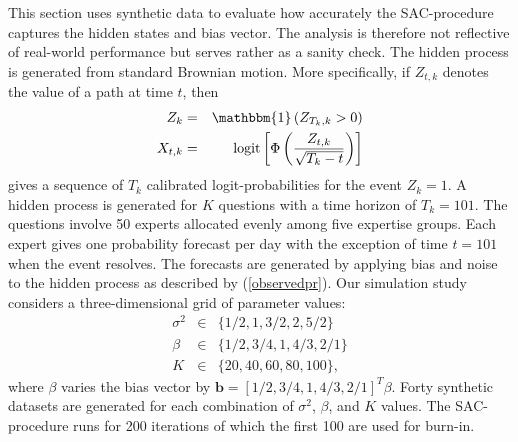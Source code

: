 \documentclass[aoas, preprint]{imsart}
\numberwithin{equation}{section}
\theoremstyle{plain}
\newcommand{\logit}{\text{logit}}
\begin{document}
This section uses synthetic data to evaluate how accurately the SAC-procedure captures the hidden states and bias vector. The analysis is therefore not reflective of real-world performance but serves rather as a sanity check. 
The hidden process is generated from standard Brownian motion.  More specifically, if $Z_{t,k}$ denotes the value of a path at time $t$, then
\begin{eqnarray*}
Z_k &=& \mathbbm{1}\left( Z_{T_k, k}  > 0\right)\\
 X_{t,k} &=& \logit \left[ \Phi \left(\frac{Z_{t, k}}{\sqrt{T_k- t}} \right) \right]
\end{eqnarray*}
gives a sequence of $T_k$ calibrated logit-probabilities for the event $Z_k = 1$. A hidden process is generated for $K$ questions with a time horizon of $T_k = 101$. The questions involve 50 experts allocated evenly among five expertise groups. Each expert gives one probability forecast per day with the exception of time $t = 101$ when the event resolves. The forecasts are generated by applying bias and noise to the hidden process as described by  (\ref{observedpr}). Our simulation study considers a three-dimensional grid of parameter values:
\begin{eqnarray*}
\sigma^2 &\in& \{1/2, 1, 3/2, 2, 5/2\}\\
\beta &\in& \{1/2, 3/4, 1, 4/3, 2/1\}\\
K &\in& \{20, 40, 60, 80, 100\},
\end{eqnarray*}
where $\beta$ varies the bias vector by $\boldsymbol{b} = [1/2, 3/4, 1, 4/3, 2/1]^T \beta$. Forty synthetic datasets are generated for each combination of $\sigma^2$, $\beta$, and $K$ values. The SAC-procedure runs for 200 iterations of which the first 100 are used for burn-in. 
\end{document}
